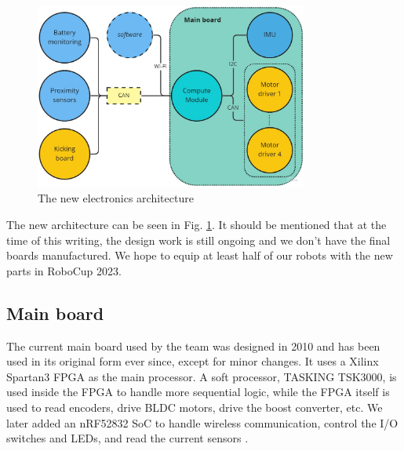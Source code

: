 \documentclass[runningheads]{llncs}
\begin{document}
\begin{figure}
	\centering
	\includegraphics[width=0.8\textwidth]{images/electronics-architecture.jpg}
	\caption{The new electronics architecture}
	\label{fig:electronics-architecture}
\end{figure}

The new architecture can be seen in Fig. \ref{fig:electronics-architecture}. It should be mentioned that at the time of this writing, the design work is still ongoing and we don't have the final boards manufactured. We hope to equip at least half of our robots with the new parts in RoboCup 2023.

\subsection{Main board}
The current main board used by the team was designed in 2010 and has been used in its original form ever since, except for minor changes. It uses a Xilinx Spartan3 FPGA as the main processor. A soft processor, TASKING TSK3000, is used inside the FPGA to handle more sequential logic, while the FPGA itself is used to read encoders, drive BLDC motors, drive the boost converter, etc. We later added an nRF52832 SoC to handle wireless communication, control the I/O switches and LEDs, and read the current sensors \cite{ref_ETDP2018}.
\end{document}
